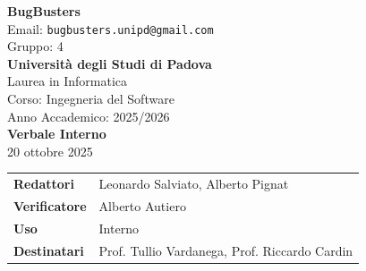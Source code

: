 \documentclass[a4paper,12pt]{article}
\begin{document}
\begin{center}  
  
  {\Large\bfseries\color{primaryblue} BugBusters}\\[0.3cm]
  {\small\color{darkgray} Email: \texttt{bugbusters.unipd@gmail.com}} \\[0.1cm]
  {\small\color{darkgray} Gruppo: 4} \\[0.5cm]

  {\large\bfseries Università degli Studi di Padova}\\[0.3cm]
  {\small Laurea in Informatica}\\[0.2cm]
  {\small Corso: Ingegneria del Software}\\[0.2cm]
  {\small Anno Accademico: 2025/2026}\\[0.8cm]

  {\Huge\bfseries\color{primaryblue} Verbale Interno}\\[0.3cm]
  {\Large\color{secondaryblue} 20 ottobre 2025}\\[0.8cm]
\end{center}

\begin{center}
\begin{tcolorbox}[colback=lightgray,colframe=primaryblue,width=0.85\textwidth,arc=3mm,boxrule=0.5pt]
\begin{tabular}{@{}ll@{}}
\textbf{Redattori}    & Leonardo Salviato, Alberto Pignat \\
\textbf{Verificatore}    & Alberto Autiero \\
\textbf{Uso}          & Interno \\
\textbf{Destinatari}  & Prof. Tullio Vardanega, Prof. Riccardo Cardin \\
\end{tabular}
\end{tcolorbox}
\end{center}
\end{document}
